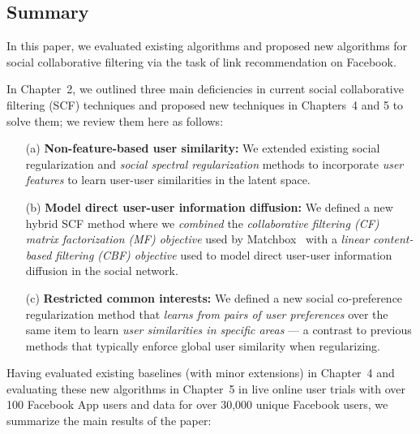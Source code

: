 
\subsection{Summary}

In this paper, we evaluated existing algorithms and proposed new
algorithms for social collaborative filtering via the task of link
recommendation on Facebook.

In Chapter~2, we outlined three main deficiencies in current social
collaborative filtering (SCF) techniques and proposed new techniques
in Chapters~4 and 5 to solve them; we review them here as follows:

\begin{itemize}
\item[(a)] {\bf Non-feature-based user similarity:} 
We extended existing social regularization and \emph{social spectral regularization} methods to incorporate \emph{user features} to learn user-user similarities in the latent space.
\item[(b)] {\bf Model direct user-user information diffusion:} 
We defined a new hybrid SCF method where we \emph{combined} the \emph{collaborative filtering (CF) matrix factorization (MF) objective} used by Matchbox~\cite{matchbox} with a \emph{linear content-based filtering (CBF) objective} used to model direct user-user information diffusion in the social network.
\item[(c)] {\bf Restricted common interests:}
We defined a new social co-preference regularization method that \emph{learns from pairs of user preferences} over the same item to learn \emph{user similarities in specific areas} --- a contrast to previous methods that typically enforce global user similarity when regularizing.
\end{itemize}

Having evaluated existing baselines (with minor extensions) in
Chapter~4 and evaluating these new algorithms in Chapter~5 in live
online user trials with over 100 Facebook App users and data for over
30,000 unique Facebook users, we summarize the main results of the
paper:

